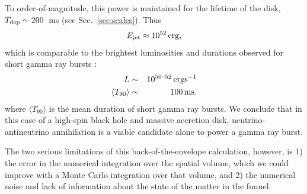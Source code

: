To order-of-magnitude, this power is maintained for the lifetime of the disk,
$T_{\rm dep}\sim200$~ms (see Sec.~\ref{sec:scales}). Thus
\begin{equation}
  E_{\rm jet} \approx 10^{52} \, {\rm erg} \nonumber,
\end{equation}
which is comparable to the brightest luminosities and durations observed for
short gamma ray bursts \citep{naka2007-review_sgrb}:
\begin{eqnarray}
  L &\sim& 10^{50\text{--}52} \, {\rm erg s^{-1}} \nonumber\\
  \langle T_{90} \rangle &\sim& 100 \,{\rm ms}. \nonumber
\end{eqnarray}
where $\langle T_{90} \rangle$ is the mean duration of short gamma ray bursts.
We conclude that in this case of a high-spin black hole and massive accretion
disk, neutrino-antineutrino annihilation is a viable candidate alone to power a
gamma ray burst.

The two serious limitations of this back-of-the-envelope calculation,
however, is 1) the error in the numerical integration over the spatial volume,
which we could improve with a Monte Carlo integration over that volume,
and 2) the numerical noise and lack of information about the state of the matter
in the funnel.

